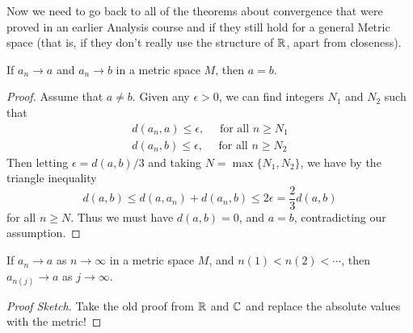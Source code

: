 \documentclass[a4paper]{scrartcl}
\begin{document}
Now we need to go back to all of the theorems about convergence that were proved in an earlier Analysis course and if they still hold for a general Metric space (that is, if they don't really use the structure of $\mathbb{R}$, apart from closeness).

\begin{lemma}
    If $a_n \rightarrow a$ and $a_n \rightarrow b$ in a metric space $M$, then $a = b$.
\end{lemma}
\begin{proof}
	Assume that $a \neq b$. Given any $\epsilon > 0$, we can find integers $N_1$ and $N_2$ such that
	\begin{align*}
		d(a_n, a) \leq \epsilon, \quad \text{ for all $n \geq N_1$}\\
		d(a_n, b) \leq \epsilon, \quad \text{ for all $n \geq N_2$}
	\end{align*}
	Then letting $\epsilon = d(a, b)/3$ and taking $N = \max\{N_1, N_2\}$, we have by the triangle inequality
	$$
	d(a, b) \leq d(a, a_n) + d(a_n, b) \leq 2\epsilon = \frac{2}{3} d(a, b)
	$$
	for all $n \geq N$.
	Thus we must have $d(a, b) = 0$, and $a = b$, contradicting our assumption.
\end{proof}

\begin{lemma}
    If $a_n \rightarrow a$ as $n \rightarrow \infty$ in a metric space $M$, and $n(1) < n(2) < \cdots$, then $a_{n(j)} \rightarrow a$ as $j \rightarrow \infty$.
\end{lemma}
\begin{proof}[Proof Sketch]
    Take the old proof from $\mathbb{R}$ and $\mathbb{C}$ and replace the absolute values with the metric!
\end{proof}
\end{document}

